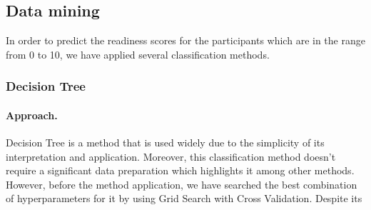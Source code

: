 \subsection{Data mining}
In order to predict the readiness scores for the participants which are in the range from 0 to 10, we have applied several classification methods.






\subsubsection{Decision Tree}
\paragraph{Approach.}
Decision Tree is a method that is used widely due to the simplicity of its interpretation and application. Moreover, this classification method doesn't require a significant data preparation which highlights it among other methods. However, before the method application, we have searched the best combination of hyperparameters for it by using Grid Search with Cross Validation. Despite its 



